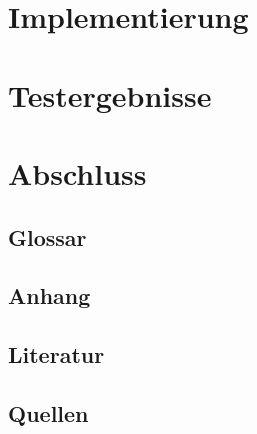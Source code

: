 \documentclass[12pt,a4paper,oneside]{report}
\begin{document}
    \section{Implementierung}
    \section{Testergebnisse}
    \section{Abschluss}
    \subsection{Glossar}
    \subsection{Anhang}
    \subsection{Literatur}
    \subsection{Quellen}
\end{document}

